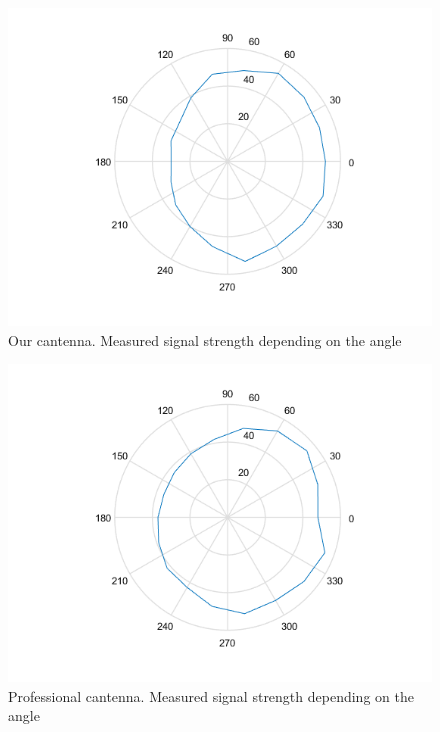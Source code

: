 \begin{figure}
	\includegraphics[width=\textwidth]{plots/polar_can_p.png}
	\caption{Our cantenna. Measured signal strength depending on the angle}
	\label{img:ang:pow:can}
\end{figure}
\begin{figure}
	\includegraphics[width=\textwidth]{plots/polar_prof_p.png}
	\caption{Professional cantenna. Measured signal strength depending on the angle}
	\label{img:ang:pow:prof}
\end{figure}
